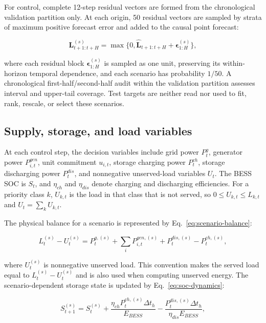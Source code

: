 For control, complete 12-step residual vectors are formed from the chronological
validation partition only. At each origin, 50 residual vectors are sampled by
strata of maximum positive forecast error and added to the causal point forecast:

\begin{equation}
\label{eq:forecast-scenarios}
\mathbf L^{(s)}_{t+1:t+H}=\max\{0,
\hat{\mathbf L}_{t+1:t+H}+\boldsymbol\epsilon^{(s)}_{1:H}\},
\end{equation}

where each residual block $\boldsymbol\epsilon^{(s)}_{1:H}$ is sampled as one
unit, preserving its within-horizon temporal dependence, and each scenario has
probability $1/50$. A chronological first-half/second-half audit within the
validation partition assesses interval and upper-tail coverage. Test targets
are neither read nor used to fit, rank, rescale, or select these scenarios.

\subsection{Supply, storage, and load
variables}\label{supply-storage-and-load-variables}

At each control step, the decision variables include grid power
$P^g_t$, generator power $P^{gen}_{i,t}$, unit commitment $u_{i,t}$,
storage charging power $P^{ch}_t$, storage discharging power $P^{dis}_t$,
and nonnegative unserved-load variables $U_t$. The BESS SOC is $S_t$,
and $\eta_{ch}$ and $\eta_{dis}$ denote charging and discharging
efficiencies. For a priority class $k$, $U_{k,t}$ is the load in that
class that is not served, so $0\leq U_{k,t}\leq L_{k,t}$ and
$U_t=\sum_k U_{k,t}$.

The physical balance for a scenario is represented by
Eq.~\eqref{eq:scenario-balance}:

\begin{equation}
\label{eq:scenario-balance}
L^{(s)}_t-U^{(s)}_t=P^{g,(s)}_t+\sum_i P^{gen,(s)}_{i,t}+P^{dis,(s)}_t-P^{ch,(s)}_t,
\end{equation}

where $U^{(s)}_t$ is nonnegative unserved load. This convention makes
the served load equal to $L^{(s)}_t-U^{(s)}_t$ and is also used when
computing unserved energy. The scenario-dependent storage state is updated by
Eq.~\eqref{eq:soc-dynamics}:

\begin{equation}
\label{eq:soc-dynamics}
S^{(s)}_{t+1}=S^{(s)}_t+\frac{\eta_{ch}P^{ch,(s)}_t\Delta t_h}{E_{BESS}}
-\frac{P^{dis,(s)}_t\Delta t_h}{\eta_{dis}E_{BESS}},
\end{equation}

